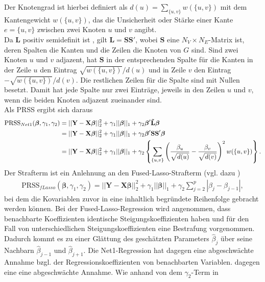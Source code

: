 \documentclass[12pt, a4paper]{report}\usepackage[]{graphicx}\usepackage[]{color}
\begin{document}
Der Knotengrad ist hierbei definiert als $d(u)=\sum_{\{u,v\}}w(\{u,v\})$ mit dem Kantengewicht $w(\{u,v\})$, das die Unsicherheit oder Stärke einer Kante $e=\{u,v\}$ zwischen zwei Knoten $u$ und $v$ angibt.\\
Da $\textbf{\~L}$ positiv semidefinit ist \cite{chung1996spectralgraph}, gilt $\textbf{\~L}=\textbf{S}\textbf{S}'$, wobei $\textbf{S}$ eine $N_V \times N_E$-Matrix ist, deren Spalten die Kanten und die Zeilen die Knoten von $G$ sind. Sind zwei Knoten $u$ und $v$ adjazent, hat $\textbf{S}$ in der entsprechenden Spalte für die Kanten in der Zeile $u$ den Eintrag $\sqrt{w(\{u,v\})}/d(u)$ und in Zeile $v$ den Eintrag $-\sqrt{w(\{u,v\})}/d(v)$. Die restlichen Zeilen für die Spalte sind mit Nullen besetzt. Damit hat jede Spalte nur zwei Einträge, jeweils in den Zeilen $u$ und $v$, wenn die beiden Knoten adjazent zueinander sind.\\
Als PRSS ergibt sich daraus
\begin{align}\label{Eq_PRSS_Net1}
\text{PRSS}_{Net1}(\boldsymbol{\beta},\gamma_1,\gamma_2)&=||\mathbf{Y}-\mathbf{X}\boldsymbol{\beta}||_2^2+\gamma_1||\boldsymbol{\beta}||_1 + \gamma_2\boldsymbol{\beta}'\textbf{\~L}\boldsymbol{\beta} \notag \\
&=||\mathbf{Y}-\mathbf{X}\boldsymbol{\beta}||_2^2+\gamma_1||\boldsymbol{\beta}||_1 +\gamma_2\boldsymbol{\beta}'\textbf{S}\textbf{S}'\boldsymbol{\beta} \notag \\
&=||\mathbf{Y}-\mathbf{X}\boldsymbol{\beta}||_2^2+\gamma_1||\boldsymbol{\beta}||_1 +\gamma_2 \left\lbrace \sum_{\{u,v\}} \left(\frac{\beta_u}{\sqrt{d(u)}}-\frac{\beta_v}{\sqrt{d(v)}}\right)^2 w(\{u,v\})\right\rbrace. 
\end{align}
Der Strafterm ist ein Anlehnung an den Fused-Lasso-Strafterm (vgl. dazu )
\begin{align*}
\text{PRSS}_{fLasso}(\boldsymbol{\beta}, \gamma_1, \gamma_2)=||\mathbf{Y}-\mathbf{X}\boldsymbol{\beta}||_2^2+\gamma_1||\boldsymbol{\beta}||_1 + \gamma_2 \sum_{j=2}^{p}|\beta_j - \beta_{j-1}|,
\end{align*}
bei dem die Kovariablen zuvor in eine inhaltlich begründete Reihenfolge gebracht werden können. Bei der Fused-Lasso-Regression wird angenommen, dass benachbarte Koeffizienten identische Steigungskoeffizienten haben und für den Fall von unterschiedlichen Steigungskoeffizienten eine Bestrafung vorgenommen. Dadurch kommt es zu einer Glättung des geschätzten Parameters $\hat{\beta}_j$ über seine Nachbarn $\hat{\beta}_{j-1}$ und $\hat{\beta}_{j+1}$. Die Net1-Regression hat dagegen eine abgeschwächte Annahme bzgl. der Regressionskoeffizienten von benachbarten Variablen.  dagegen eine eine abgeschwächte Annahme. Wie anhand von dem $\gamma_2$-Term in 
\end{document}
